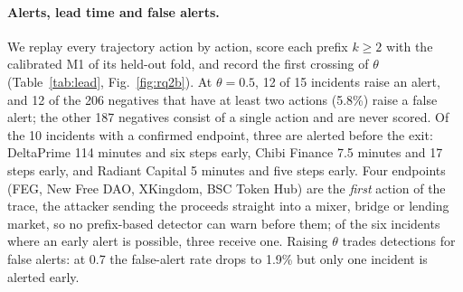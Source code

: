 \paragraph{Alerts, lead time and false alerts.}
We replay every trajectory action by action, score each prefix $k\ge2$ with the calibrated M1 of its held-out fold, and record the first crossing of $\theta$ (Table~\ref{tab:lead}, Fig.~\ref{fig:rq2b}).
At $\theta=0.5$, 12 of 15 incidents raise an alert, and 12 of the 206 negatives that have at least two actions (5.8\%) raise a false alert; the other 187 negatives consist of a single action and are never scored.
Of the 10 incidents with a confirmed endpoint, three are alerted before the exit: DeltaPrime 114 minutes and six steps early, Chibi Finance 7.5 minutes and 17 steps early, and Radiant Capital 5 minutes and five steps early.
Four endpoints (FEG, New Free DAO, XKingdom, BSC Token Hub) are the \emph{first} action of the trace, the attacker sending the proceeds straight into a mixer, bridge or lending market, so no prefix-based detector can warn before them; of the six incidents where an early alert is possible, three receive one.
Raising $\theta$ trades detections for false alerts: at 0.7 the false-alert rate drops to 1.9\% but only one incident is alerted early.

\begin{table}[t]
\centering
\caption{RQ2: first alerts of calibrated M1 when every prefix $k\ge2$ is scored online. ``Before $t_e$'' counts the 10 incidents with a confirmed endpoint; 4 of them have their endpoint at $k=1$ and cannot be alerted early. False alerts are per trajectory over the 206 negatives with $\ge2$ actions.}
\label{tab:lead}
\small
{}
\end{table}

